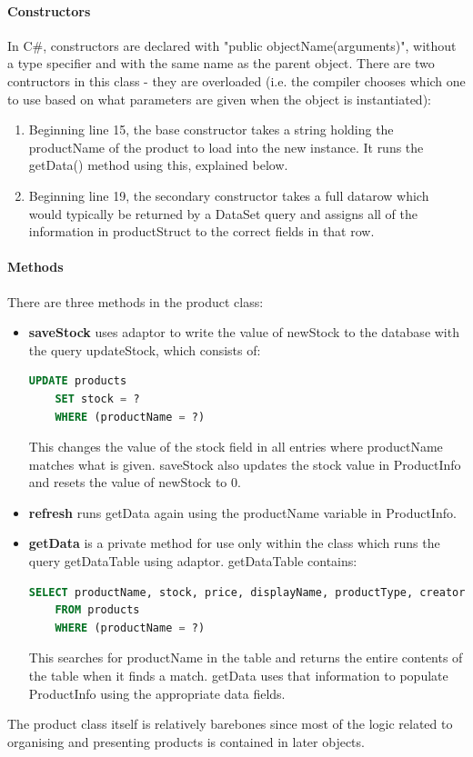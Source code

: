 ﻿\documentclass{article}
\begin{document}
    \paragraph{Constructors}
    In C\#, constructors are declared with "public objectName(arguments)", without a type specifier and with the same name as the parent object.
    There are two contructors in this class - they are overloaded (i.e. the compiler chooses which one to use based on what parameters are given when the object is instantiated):
    \begin{enumerate}
        \item Beginning line 15, the base constructor takes a string holding the productName of the product to load into the new instance.
        It runs the getData() method using this, explained below.
        \item Beginning line 19, the secondary constructor takes a full datarow which would typically be returned by a DataSet query and assigns all of the information in productStruct to the correct fields in that row.
    \end{enumerate}
    \paragraph{Methods}
    There are three methods in the product class:
    \begin{itemize}
        \item \textbf{saveStock} uses adaptor to write the value of newStock to the database with the query updateStock, which consists of:
        \begin{lstlisting}[language=SQL]
    UPDATE products
    SET stock = ?
    WHERE (productName = ?)
        \end{lstlisting}
        This changes the value of the stock field in all entries where productName matches what is given.
        saveStock also updates the stock value in ProductInfo and resets the value of newStock to 0.
        \item \textbf{refresh} runs getData again using the productName variable in ProductInfo.
        \item \textbf{getData} is a private method for use only within the class which runs the query getDataTable using adaptor.
        getDataTable contains:
        \begin{lstlisting}[language=SQL]
    SELECT productName, stock, price, displayName, productType, creator, [image], [band], description
    FROM products
    WHERE (productName = ?)
        \end{lstlisting}
        This searches for productName in the table and returns the entire contents of the table when it finds a match.
        getData uses that information to populate ProductInfo using the appropriate data fields.
    \end{itemize}
    The product class itself is relatively barebones since most of the logic related to organising and presenting products is contained in later objects.
\end{document}
